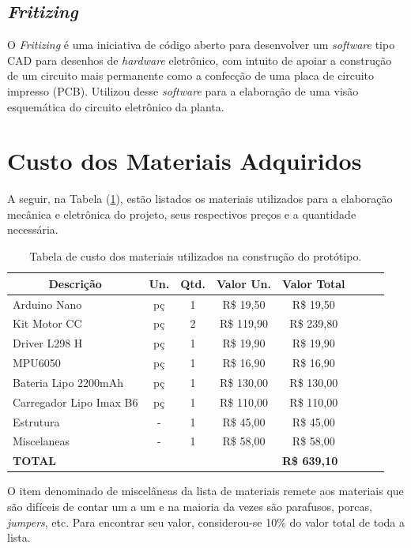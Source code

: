 \subsection{\textit{Fritizing}}

O \textit{Fritizing} é uma iniciativa de código aberto para desenvolver um \textit{software} tipo CAD para desenhos de \textit{hardware} eletrônico, com intuito de apoiar a construção de um circuito mais permanente como a confecção de uma placa de circuito impresso (PCB). Utilizou desse \textit{software} para a elaboração de uma visão esquemática do circuito eletrônico da planta.

\section{Custo dos Materiais Adquiridos}

A seguir, na Tabela (\ref{tab:CustoMateriais}), estão listados os materiais utilizados para a elaboração mecânica e eletrônica do projeto, seus respectivos preços e a quantidade necessária.
\begin{table}[!htb]
\centering
\caption{Tabela de custo dos materiais utilizados na construção do protótipo.}
\label{tab:CustoMateriais}
\begin{tabular}{@{}lccccccc@{}}
\toprule
\multicolumn{1}{c}{\textbf{Descrição}} & \textbf{Un.} & \textbf{Qtd.} & \textbf{Valor Un.} & \textbf{Valor Total}  \\ \midrule
Arduino Nano            & pç  & 1   & R\$ 19,50   & R\$ 19,50   &                          \\
Kit Motor CC            & pç  & 2   & R\$ 119,90  & R\$ 239,80  &                          \\
Driver L298 H           & pç  & 1   & R\$ 19,90   & R\$ 19,90   &                          \\
MPU6050                 & pç  & 1   & R\$ 16,90   & R\$ 16,90   &                          \\
Bateria Lipo 2200mAh    & pç  & 1   & R\$ 130,00  & R\$ 130,00  &                          \\
Carregador Lipo Imax B6 & pç  & 1   & R\$ 110,00  & R\$ 110,00  &                          \\
Estrutura               & -   & 1   & R\$ 45,00   & R\$ 45,00   &                          \\
Miscelaneas             & -   & 1   & R\$ 58,00   & R\$ 58,00   &                           \\
\multicolumn{4}{l}{\textbf{TOTAL}}                                                       & \multicolumn{1}{l}{\textbf{R\$ 639,10}} \\ \bottomrule
\end{tabular}
\end{table}

O item denominado de miscelâneas da lista de materiais remete aos materiais que são difíceis de contar um a um e na maioria da vezes são parafusos, porcas, \textit{jumpers}, etc. Para encontrar seu valor, considerou-se 10\% do valor total de toda a lista.